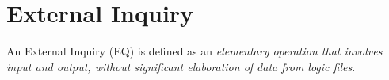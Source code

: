 \section{External Inquiry}
An External Inquiry (EQ) is defined as an \emph{elementary operation that involves input and output, without significant elaboration of data from logic files}.
